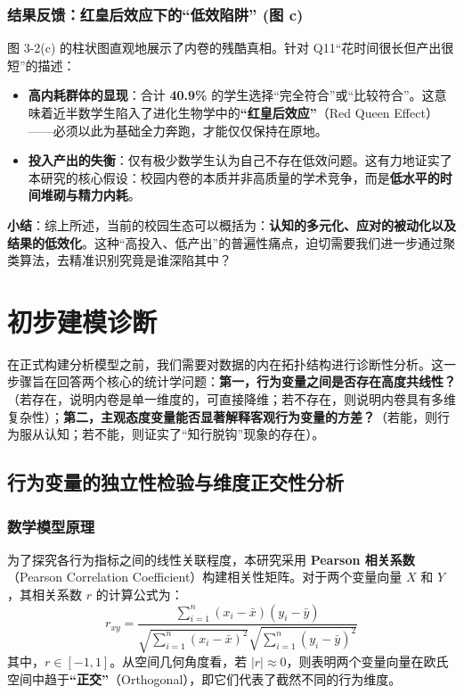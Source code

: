 \documentclass[win,thesis]{hustreport} %
\begin{document}
\subsubsection*{结果反馈：红皇后效应下的“低效陷阱” (图 c)}
图 3-2(c) 的柱状图直观地展示了内卷的残酷真相。针对 Q11“花时间很长但产出很短”的描述：
\begin{itemize}
	\item \textbf{高内耗群体的显现}：合计 \textbf{40.9\%} 的学生选择“完全符合”或“比较符合”。这意味着近半数学生陷入了进化生物学中的\textbf{“红皇后效应”}（Red Queen Effect）——必须以此为基础全力奔跑，才能仅仅保持在原地。
	\item \textbf{投入产出的失衡}：仅有极少数学生认为自己不存在低效问题。这有力地证实了本研究的核心假设：校园内卷的本质并非高质量的学术竞争，而是\textbf{低水平的时间堆砌与精力内耗}。
\end{itemize}

\textbf{小结}：综上所述，当前的校园生态可以概括为：\textbf{认知的多元化、应对的被动化以及结果的低效化}。这种“高投入、低产出”的普遍性痛点，迫切需要我们进一步通过聚类算法，去精准识别究竟是谁深陷其中？

\newpage
\section{初步建模诊断}

在正式构建分析模型之前，我们需要对数据的内在拓扑结构进行诊断性分析。这一步骤旨在回答两个核心的统计学问题：\textbf{第一，行为变量之间是否存在高度共线性？}（若存在，说明内卷是单一维度的，可直接降维；若不存在，则说明内卷具有多维复杂性）；\textbf{第二，主观态度变量能否显著解释客观行为变量的方差？}（若能，则行为服从认知；若不能，则证实了“知行脱钩”现象的存在）。

\subsection{行为变量的独立性检验与维度正交性分析}

\subsubsection{数学模型原理}
为了探究各行为指标之间的线性关联程度，本研究采用 \textbf{Pearson 相关系数}（Pearson Correlation Coefficient）构建相关性矩阵。对于两个变量向量 $X$ 和 $Y$，其相关系数 $r$ 的计算公式为：
\begin{equation}
	r_{xy} = \frac{\sum_{i=1}^{n}(x_i - \bar{x})(y_i - \bar{y})}{\sqrt{\sum_{i=1}^{n}(x_i - \bar{x})^2} \sqrt{\sum_{i=1}^{n}(y_i - \bar{y})^2}}
\end{equation}
其中，$r \in [-1, 1]$。从空间几何角度看，若 $|r| \approx 0$，则表明两个变量向量在欧氏空间中趋于\textbf{“正交”}（Orthogonal），即它们代表了截然不同的行为维度。
\end{document}
